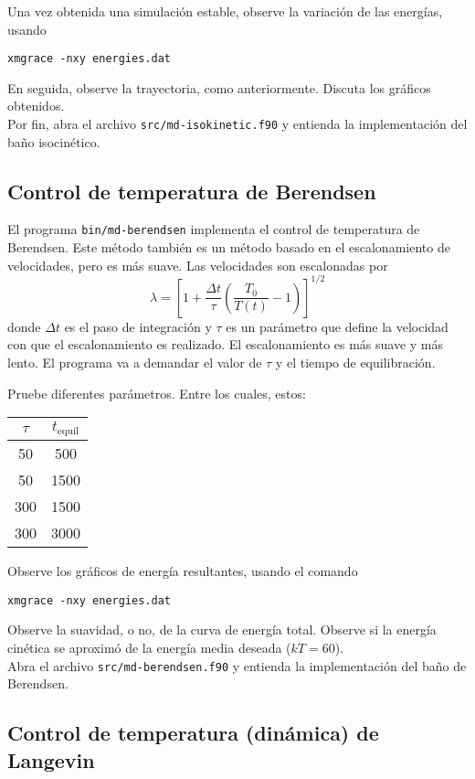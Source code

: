 \documentclass[10pt,a4paper,ssfamily]{exam}
\newcommand{\1}{{\bf 1}}
\newcommand{\2}{{\bf 2}}
\newcommand{\3}{{\bf 3}}
\newcommand{\command}[1]{\begin{center}{\tt #1}\end{center}}
\begin{document}
Una vez obtenida una simulación estable, observe la variación de las
energías, usando 
\command{xmgrace -nxy energies.dat}
En seguida, observe la trayectoria, como anteriormente. Discuta los
gráficos obtenidos. \\

\noindent
Por fin, abra el archivo {\tt src/md-isokinetic.f90} y entienda la implementación
del baño isocinético.

\subsection{Control de temperatura de Berendsen}

El programa {\tt bin/md-berendsen} implementa el control de temperatura
de Berendsen. Este método también es un método basado en el
escalonamiento de velocidades, pero es más suave. Las velocidades son
escalonadas por
\[
\lambda = \left[  
1 + \frac{\Delta t}{\tau} \left(
\frac{T_0}{T(t)} -1
\right)
\right]^{1/2}
\]
donde $\Delta t$ es el paso de integración y $\tau$ es un parámetro que
define la velocidad con que el escalonamiento es realizado. El
escalonamiento es más suave y más lento. El programa va a demandar el
valor de $\tau$ y el tiempo de equilibración. 

Pruebe diferentes parámetros. Entre los cuales, estos: 
{\tt \begin{center}\begin{tabular}{cc}
\hline
  $\tau$ & $t_{\mathrm{equil}}$ \\
\hline
    50   &  500 \\
    50   &  1500 \\
   300   &  1500 \\
   300   &  3000 \\
\hline
\end{tabular}\end{center}}
Observe los gráficos de energía resultantes, usando el comando
\command{xmgrace -nxy energies.dat}
Observe la suavidad, o no, de la curva de energía total. Observe si la
energía cinética se aproximó de la energía media deseada ($kT=60$).\\

\noindent
Abra el archivo {\tt src/md-berendsen.f90} y entienda la implementación
del baño de Berendsen.

\subsection{Control de temperatura (dinámica) de Langevin}
\end{document}
